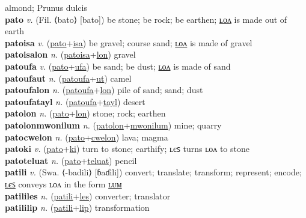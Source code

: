 almond; Prunus dulcis \label{patam} \\
\textbf{pato} \textit{v.} (Fil. ⟨bato⟩ [bato])
be stone; be rock; be earthen; \hyperref[patolon]{ʟᴏᴧ} is made out of earth \label{pato} \\
\textbf{patoisa} \textit{v.} (\hyperref[pato]{pato}+\hyperref[isa]{isa})
be gravel; course sand; \hyperref[patoisalon]{ʟᴏᴧ} is made of gravel \label{patoisa} \\
\textbf{patoisalon} \textit{n.} (\hyperref[patoisa]{patoisa}+\hyperref[lon]{lon})
gravel \label{patoisalon} \\
\textbf{patoufa} \textit{v.} (\hyperref[pato]{pato}+\hyperref[ufa]{ufa})
be sand; be dust; \hyperref[patoufalon]{ʟᴏᴧ} is made of sand \label{patoufa} \\
\textbf{patoufaut} \textit{n.} (\hyperref[patoufa]{patoufa}+\hyperref[ut]{ut})
camel \label{patoufaut} \\
\textbf{patoufalon} \textit{n.} (\hyperref[patoufa]{patoufa}+\hyperref[lon]{lon})
pile of sand; sand; dust \label{patoufalon} \\
\textbf{patoufatayl} \textit{n.} (\hyperref[patoufa]{patoufa}+\hyperref[tayl]{tayl})
desert \label{patoufatayl} \\
\textbf{patolon} \textit{n.} (\hyperref[pato]{pato}+\hyperref[lon]{lon})
stone; rock; earthen \label{patolon} \\
\textbf{patolonmwonilum} \textit{n.} (\hyperref[patolon]{patolon}+\hyperref[mwonilum]{mwonilum})
mine; quarry \label{patolonmwonilum} \\
\textbf{patocwelon} \textit{n.} (\hyperref[pato]{pato}+\hyperref[cwelon]{cwelon})
lava; magma \label{patocwelon} \\
\textbf{patoki} \textit{v.} (\hyperref[pato]{pato}+\hyperref[ki]{ki})
turn to stone; earthify; ʟєꜱ turns ʟᴏᴧ to stone \label{patoki} \\
\textbf{patoteluat} \textit{n.} (\hyperref[pato]{pato}+\hyperref[teluat]{teluat})
pencil \label{patoteluat} \\
\textbf{patili} \textit{v.} (Swa. ⟨-badili⟩ [ɓaɗili])
convert; translate; transform; represent; encode; \hyperref[patililes]{ʟєꜱ} conveys ʟᴏᴧ in the form \hyperref[patililum]{ʟᴜᴍ} \label{patili} \\
\textbf{patililes} \textit{n.} (\hyperref[patili]{patili}+\hyperref[les]{les})
converter; translator \label{patililes} \\
\textbf{patililip} \textit{n.} (\hyperref[patili]{patili}+\hyperref[lip]{lip})
transformation \label{patililip} \\
